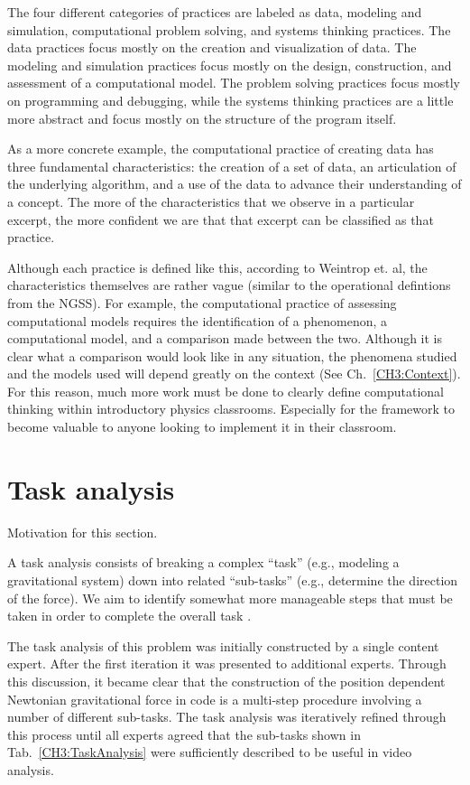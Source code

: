 \documentclass{msuphddissertation}
\begin{document}
\begin{doublespace}
The four different categories of practices are labeled as data, modeling and simulation, computational problem solving, and systems thinking practices.  The data practices focus mostly on the creation and visualization of data.  The modeling and simulation practices focus mostly on the design, construction, and assessment of a computational model.  The problem solving practices focus mostly on programming and debugging, while the systems thinking practices are a little more abstract and focus mostly on the structure of the program itself.

As a more concrete example, the computational practice of creating data has three fundamental characteristics: the creation of a set of data, an articulation of the underlying algorithm, and a use of the data to advance their understanding of a concept.  The more of the characteristics that we observe in a particular excerpt, the more confident we are that that excerpt can be classified as that practice.

Although each practice is defined like this, according to Weintrop et. al, the characteristics themselves are rather vague (similar to the operational defintions from the NGSS).  For example, the computational practice of assessing computational models requires the identification of a phenomenon, a computational model, and a comparison made between the two.  Although it is clear what a comparison would look like in any situation, the phenomena studied and the models used will depend greatly on the context (See Ch.~\ref{CH3:Context}).  For this reason, much more work must be done to clearly define computational thinking within introductory physics classrooms.  Especially for the framework to become valuable to anyone looking to implement it in their classroom.

\section{Task analysis}

Motivation for this section.

A task analysis consists of breaking a complex ``task'' (e.g., modeling a gravitational system) down into related ``sub-tasks'' (e.g., determine the direction of the force). We aim to identify somewhat more manageable steps that must be taken in order to complete the overall task \cite{Catrambone1998}.

The task analysis of this problem was initially constructed by a single content expert. After the first iteration it was presented to additional experts. Through this discussion, it became clear that the construction of the position dependent Newtonian gravitational force in code is a multi-step procedure involving a number of different sub-tasks. The task analysis was iteratively refined through this process until all experts agreed that the sub-tasks shown in Tab.~\ref{CH3:TaskAnalysis} were sufficiently described to be useful in video analysis.


\end{doublespace}
\end{document}
